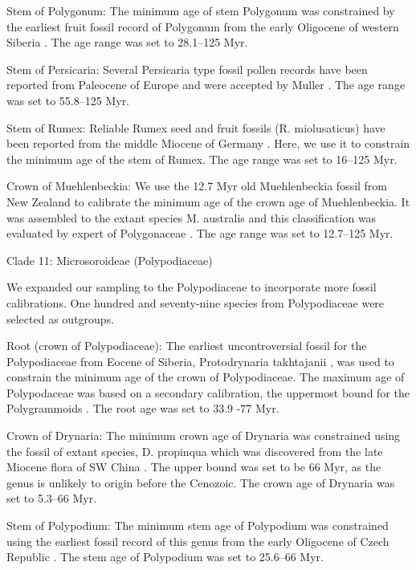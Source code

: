 \documentclass[10pt]{article}
\begin{document}
Stem of Polygonum: The minimum age of stem Polygonum was constrained
by the earliest fruit fossil record of Polygonum from the early
Oligocene of western Siberia \citep{Dorofeev1963}. The age range was
set to 28.1--125 Myr.

Stem of Persicaria: Several Persicaria type fossil pollen records have
been reported from Paleocene of Europe \citep{Krutzsch1970,Gruas1978}
and were accepted by Muller \citep{Muller1981}. The age range was set
to 55.8--125 Myr.

Stem of Rumex: Reliable Rumex seed and fruit fossils (R. miolusaticus)
have been reported from the middle Miocene of Germany
\citep{Mai2001}. Here, we use it to constrain the minimum age of the
stem of Rumex. The age range was set to 16--125 Myr.

Crown of Muehlenbeckia: We use the 12.7 Myr old Muehlenbeckia fossil
from New Zealand \citep{Pole1993} to calibrate the minimum age of the
crown age of Muehlenbeckia. It was assembled to the extant species
M. australis \citep{Pole1993} and this classification was evaluated by
expert of Polygonaceae \citep{Schuster2013}. The age range was set to
12.7--125 Myr.

Clade 11: Microsoroideae (Polypodiaceae)

We expanded our sampling to the Polypodiaceae to incorporate more
fossil calibrations. One hundred and seventy-nine species from
Polypodiaceae were selected as outgroups. 

Root (crown of Polypodiaceae): The earliest uncontroversial fossil for
the Polypodiaceae from Eocene of Siberia, Protodrynaria takhtajanii
\citep{Vikulin1987}, was used to constrain the minimum age
of the crown of Polypodiaceae. The maximum age of Polypodaceae was
based on a secondary calibration, the uppermost bound for the
Polygrammoids \citep{Schuettpelz2009}. The root age was set
to 33.9 -77 Myr.

Crown of Drynaria: The minimum crown age of Drynaria was constrained
using the fossil of extant species, D. propinqua which was discovered
from the late Miocene flora of SW China \citep{Wen2013}. The upper
bound was set to be 66 Myr, as the genus is unlikely to origin before
the Cenozoic. The crown age of Drynaria was set to 5.3--66 Myr.

Stem of Polypodium: The minimum stem age of Polypodium was constrained
using the earliest fossil record of this genus from the early
Oligocene of Czech Republic \citep{Kvacek2001}. The stem age of
Polypodium was set to 25.6--66 Myr.
\end{document}

